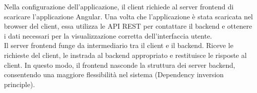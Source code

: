 Nella configurazione dell'applicazione, il client richiede al server frontend di scaricare l'applicazione Angular. Una volta che l'applicazione è stata scaricata nel browser del client, essa utilizza le API REST per contattare il backend e ottenere i dati necessari per la visualizzazione corretta dell'interfaccia utente.\\

Il server frontend funge da intermediario tra il client e il backend. Riceve le richieste del client, le instrada al backend appropriato e restituisce le risposte al client. In questo modo, il frontend nasconde la struttura dei server backend, consentendo una maggiore flessibilità nel sistema (Dependency inversion principle).\\